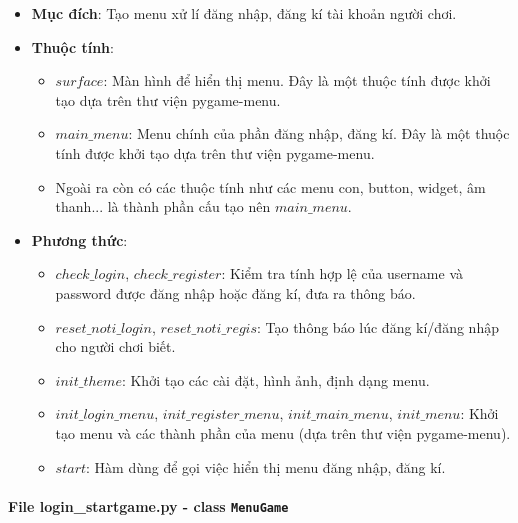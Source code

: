 \begin{itemize}
    \item \textbf{Mục đích}: Tạo menu xử lí đăng nhập, đăng kí tài khoản người chơi.
    \item \textbf{Thuộc tính}:
    
    \begin{itemize}
        \item $surface$: Màn hình để hiển thị menu. Đây là một thuộc tính được khởi tạo dựa trên thư viện pygame-menu.
        \item $main\_menu$: Menu chính của phần đăng nhập, đăng kí. Đây là một thuộc tính được khởi tạo dựa trên thư viện pygame-menu.
        \item Ngoài ra còn có các thuộc tính như các menu con, button, widget, âm thanh... là thành phần cấu tạo nên $main\_menu$.
    \end{itemize}
    
    \item \textbf{Phương thức}:

    \begin{itemize}
        \item $check\_login$, $check\_register$: Kiểm tra tính hợp lệ của username và password được đăng nhập hoặc đăng kí, đưa ra thông báo.
        \item $reset\_noti\_login$, $reset\_noti\_regis$: Tạo thông báo lúc đăng kí/đăng nhập cho người chơi biết.
        \item $init\_theme$: Khởi tạo các cài đặt, hình ảnh, định dạng menu.
        \item $init\_login\_menu$, $init\_register\_menu$, $init\_main\_menu$, $init\_menu$: Khởi tạo menu và các thành phần của menu (dựa trên thư viện pygame-menu).
        \item $start$: Hàm dùng để gọi việc hiển thị menu đăng nhập, đăng kí.
    \end{itemize}
    
\end{itemize}

\paragraph{File login\_startgame.py - class \texttt{MenuGame}}

